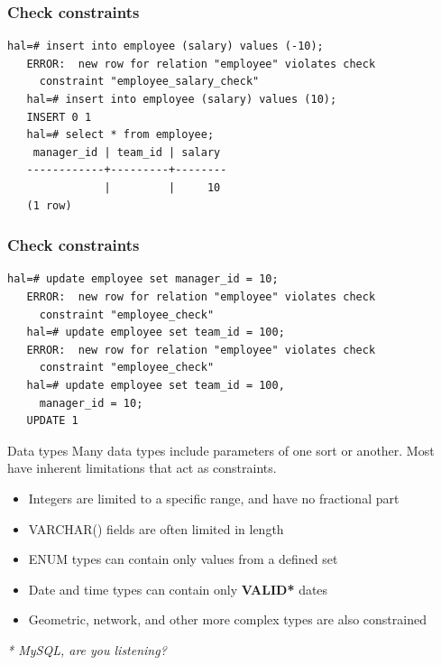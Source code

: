 \documentclass{beamer}
\begin{document}
\begin{frame}[fragile]
    \frametitle{Check constraints}
    \small
    \begin{Verbatim}[fontfamily=courier]
   hal=# insert into employee (salary) values (-10);
   ERROR:  new row for relation "employee" violates check
     constraint "employee_salary_check"
   hal=# insert into employee (salary) values (10);
   INSERT 0 1
   hal=# select * from employee;
    manager_id | team_id | salary
   ------------+---------+--------
               |         |     10
   (1 row)
    \end{Verbatim}
\end{frame}

\begin{frame}[fragile]
    \frametitle{Check constraints}
    \small
    \begin{Verbatim}[fontfamily=courier]
   hal=# update employee set manager_id = 10;
   ERROR:  new row for relation "employee" violates check
     constraint "employee_check"
   hal=# update employee set team_id = 100;
   ERROR:  new row for relation "employee" violates check
     constraint "employee_check"
   hal=# update employee set team_id = 100,
     manager_id = 10;
   UPDATE 1
    \end{Verbatim}
\end{frame}

\begin{frame}{Data types}
    Many data types include parameters of one sort or another. Most have
    inherent limitations that act as constraints.
    \begin{itemize}
        \item Integers are limited to a specific range, and have no fractional part
        \item VARCHAR() fields are often limited in length
        \item ENUM types can contain only values from a defined set
        \item Date and time types can contain only {\bf{\color{red}VALID*}} dates
        \item Geometric, network, and other more complex types are also constrained
    \end{itemize}
    \vspace{10mm}
    {\footnotesize \color{red} \emph{* MySQL, are you listening?}}
\end{frame}
\end{document}
